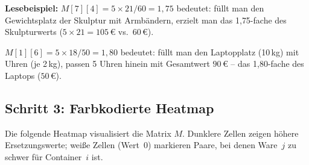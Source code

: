 \documentclass[a4paper,11pt]{article}
\begin{document}
\noindent
\textbf{Lesebeispiel:}
$M[7][4] = 5 \times 21/60 = 1{,}75$ bedeutet:
füllt man den Gewichtsplatz der Skulptur mit Armbändern,
erzielt man das 1{,}75-fache des Skulpturwerts
($5 \times 21 = 105$\,\euro{} vs.\ $60$\,\euro).

\noindent
$M[1][6] = 5 \times 18/50 = 1{,}80$ bedeutet:
füllt man den Laptopplatz (10\,kg) mit Uhren (je 2\,kg),
passen 5 Uhren hinein mit Gesamtwert $90$\,\euro{} --
das 1{,}80-fache des Laptops ($50$\,\euro).

\subsection{Schritt 3: Farbkodierte Heatmap}

Die folgende Heatmap visualisiert die Matrix $M$.
Dunklere Zellen zeigen höhere Ersetzungswerte;
weiße Zellen (Wert~0) markieren Paare, bei denen
Ware~$j$ zu schwer für Container~$i$ ist.
\end{document}
